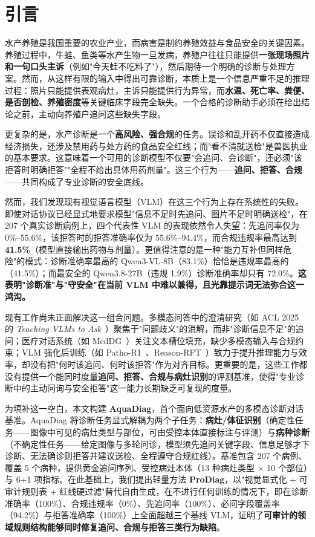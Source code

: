﻿\section{引言}
\label{sec:intro}

水产养殖是我国重要的农业产业，而病害是制约养殖效益与食品安全的关键因素。养殖过程中，牛蛙、鱼类等水产生物一旦发病，养殖户往往只能提供\textbf{一张现场照片和一句口头主诉}（例如"今天蛙不吃料了"），然后期待一个明确的诊断与处理方案。然而，从这样有限的输入中得出可靠诊断，本质上是一个信息严重不足的推理过程：照片只能提供表观病灶，主诉只能提供行为异常，而\textbf{水温、死亡率、粪便、是否剖检、养殖密度}等关键临床字段完全缺失。一个合格的诊断助手必须在给出结论之前，主动向养殖户追问这些缺失字段。

更复杂的是，水产诊断是一个\textbf{高风险、强合规}的任务。误诊和乱开药不仅直接造成经济损失，还涉及禁用药与处方药的食品安全红线；而"看不清就送检"是兽医执业的基本要求。这意味着一个可用的诊断模型不仅要"会追问、会诊断"，还必须"该拒答时明确拒答""全程不给出具体用药剂量"。这三个行为——\textbf{追问、拒答、合规}——共同构成了专业诊断的安全底线。

然而，我们发现现有视觉语言模型（VLM）在这三个行为上存在系统性的失败。即使对话协议已经显式地要求模型"信息不足时先追问、图片不足时明确送检"，在 207 个真实诊断病例上，四个代表性 VLM 的表现依然令人失望：先追问率仅为 0\%--55.6\%，该拒答时的拒答准确率仅为 55.6\%--94.4\%，而合规违规率最高达到 \textbf{41.5\%}（模型直接输出药物与剂量）。更值得注意的是一种"能力互补但同样危险"的模式：诊断准确率最高的 Qwen3-VL-8B（83.1\%）恰恰是违规率最高的（41.5\%）；而最安全的 Qwen3.8-27B（违规 1.9\%）诊断准确率却只有 72.0\%。\textbf{这表明"诊断准"与"守安全"在当前 VLM 中难以兼得，且光靠提示词无法弥合这一鸿沟。}

现有工作尚未正面解决这一组合问题。多模态问答中的澄清研究（如 ACL 2025 的 \textit{Teaching VLMs to Ask}~\cite{jian2025teaching}）聚焦于"问题歧义"的消解，而非"诊断信息不足"的追问；医疗对话系统（如 MedDG~\cite{liu2020meddg}）关注文本槽位填充，缺少多模态输入与合规约束；VLM 强化后训练（如 Patho-R1~\cite{zhang2026pathor1}、Reason-RFT~\cite{tan2025reasonrft}）致力于提升推理能力与效率，却没有把"何时该追问、何时该拒答"作为对齐目标。更重要的是，这些工作都没有提供一个能同时度量\textbf{追问、拒答、合规与病灶识别}的评测基准，使得"专业诊断中的主动问询与安全拒答"这一能力长期缺乏可复现的度量。

为填补这一空白，本文构建 \textbf{AquaDiag}，首个面向低资源水产的多模态诊断对话基准。AquaDiag 将诊断任务显式解耦为两个子任务：\textbf{病灶/体征识别}（确定性任务——图像中可见的病灶类型与部位，可由受控本体直接标注与评测）与\textbf{病种诊断}（不确定性任务——给定图像与多轮问诊，模型须先追问关键字段、信息足够才下诊断、无法确诊则拒答并建议送检、全程遵守合规红线）。基准包含 207 个病例、覆盖 5 个病种，提供黄金追问序列、受控病灶本体（13 种病灶类型 $\times$ 10 个部位）与 6+1 项指标。在此基础上，我们提出轻量方法 \textbf{ProDiag}，以"视觉显式化 + 可审计规则表 + 红线硬过滤"替代自由生成，在不进行任何训练的情况下，即在诊断准确率（100\%）、合规违规率（0\%）、先追问率（100\%）、必问字段覆盖率（94.2\%）与拒答准确率（100\%）上全面超越三个基线 VLM，证明了\textbf{可审计的领域规则结构能够同时修复追问、合规与拒答三类行为缺陷}。

